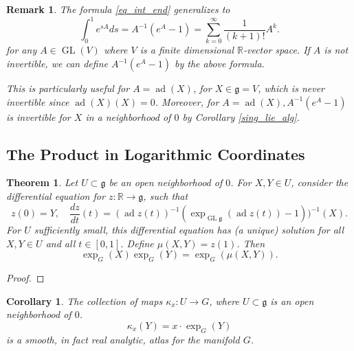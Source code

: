 \documentclass{article}
\newtheorem{theorem}{Theorem}[section]
\newtheorem{remark}{Remark}[section]
\newtheorem{corollary}{Corollary}[section]
\numberwithin{equation}{section}
\DeclareMathOperator{\ad}{ad}
\DeclareMathOperator{\GL}{GL}
\begin{document}
\begin{remark}
The formula \eqref{eq_int_end} generalizes to 
\begin{equation*}
\int_0^1e^{sA}ds = A^{-1}(e^A-1)=\sum_{k=0}^\infty {\frac 1 {(k+1)!}}A^k.
\end{equation*}
for any $A\in\GL(V)$ where $V$ is a finite dimensional $\mathbb{R}$-vector space. If $A$ is not invertible, we can define $A^{-1}(e^A-1)$ by the above formula.\\
\par This is particularly useful for $A=\ad(X)$, for $X\in\mathfrak{g}=V$, which is never invertible since $\ad(X)(X)=0$. Moreover, for $A=\ad(X), A^{-1}(e^A-1)$ is invertible for $X$ in a neighborhood of $0$ by Corollary \ref{sing_lie_alg}.
\end{remark}

\subsection{The Product in Logarithmic Coordinates}

\begin{theorem}
Let $U\subset\mathfrak{g}$ be an open neighborhood of $0$. For $X,Y\in U$, consider the differential equation for $z:\mathbb{R}\to\mathfrak{g}$, such that
\begin{equation*}
z(0)=Y,\quad{\frac {dz} {dt}}(t) = (\ad z(t))^{-1}(\exp_{\GL{\mathfrak{g}}}(\ad z(t))-1))^{-1}(X).
\end{equation*}
For $U$ sufficiently small, this differential equation has (a unique) solution for all $X,Y\in U$ and all $t\in[0,1]$. Define $\mu(X,Y) = z(1)$. Then 
\begin{equation*}
\exp_G(X)\exp_G(Y) = \exp_G(\mu(X,Y)).
\end{equation*}
\label{product_exp_expression}
\end{theorem}

\begin{proof}
\end{proof}

\begin{corollary}
The collection of maps $\kappa_x:U\to G$, where $U\subset\mathfrak{g}$ is an open neighborhood of $0$. 
\begin{equation*}
\kappa_x(Y)= x\cdot\exp_G(Y)
\end{equation*}
is a smooth, in fact real analytic, atlas for the manifold $G$.
\label{atlas_generated_by_exponential_map}
\end{corollary}
\end{document}
